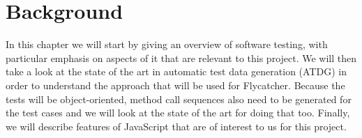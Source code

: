 \documentclass[a4paper,11pt,titlepage]{report}
\begin{document}


\chapter{Background}
In this chapter we will start by giving an overview of software testing, with particular emphasis on aspects of it that are relevant to this project. We will then take a look at the state of the art in automatic test data generation (ATDG) in order to understand the approach that will be used for \textsf{Flycatcher}. Because the tests will be object-oriented, method call sequences also need to be generated for the test cases and we will look at the state of the art for doing that too. Finally, we will describe features of JavaScript that are of interest to us for this project.
\end{document}

